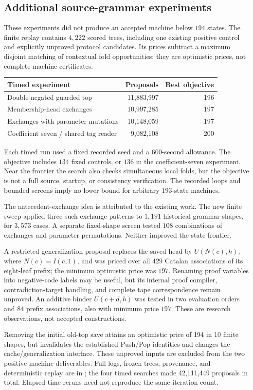 \subsection{Additional source-grammar experiments}
These experiments did not produce an accepted machine below $194$ states.
The finite replay contains $4{,}222$ scored trees, including one existing
positive control and explicitly unproved protocol candidates. Its prices
subtract a maximum disjoint matching of contextual fold opportunities;
they are optimistic prices, not complete machine certificates.
\begin{center}\small
\begin{tabular}{lrr}
\hline
Timed experiment & Proposals & Best objective\\\hline
Double-negated guarded top & 11{,}883{,}997 & 196\\
Membership-head exchanges & 10{,}997{,}285 & 197\\
Exchanges with parameter mutations & 10{,}148{,}059 & 197\\
Coefficient seven / shared tag reader & 9{,}082{,}108 & 200\\
\hline
\end{tabular}
\end{center}
Each timed run used a fixed recorded seed and a $600$-second allowance.
The objective includes $134$ fixed controls, or $136$ in the coefficient-seven
experiment. Near the frontier the search also checks simultaneous local folds,
but the objective is not a full source, startup, or consistency verification.
The recorded loops and bounded screens imply no lower bound for arbitrary
$193$-state machines.

The antecedent-exchange idea is attributed to the existing
 work. The new finite sweep
applied three such exchange patterns to $1{,}191$ historical grammar shapes,
for $3{,}573$ cases. A separate fixed-shape screen tested $108$ combinations
of exchanges and parameter permutations. Neither improved the state frontier.

A restricted-generalization proposal replaces the saved head by
$U(N(c),h)$, where $N(c)=I(c,1)$, and was priced over all $429$ Catalan
associations of its eight-leaf prefix; the minimum optimistic price was $197$.
Renaming proof variables into negative-code labels may be useful, but its
internal proof compiler, contradiction-target handling, and complete tape
correspondence remain unproved. An additive binder $U(c+d,h)$ was tested
in two evaluation orders and $84$ prefix associations, also with minimum
price $197$. These are research observations, not accepted constructions.


Removing the initial old-top save attains an optimistic price of 194 in
10 finite shapes, but invalidates the established Push/Pop identities and
changes the cache/generalization interface. These unproved inputs are
excluded from the two positive machine deliverables. Full logs, frozen
trees, provenance, and deterministic replay are in
; the four timed searches made 42,111,449 proposals
in total. Elapsed-time reruns need not reproduce the same iteration count.
